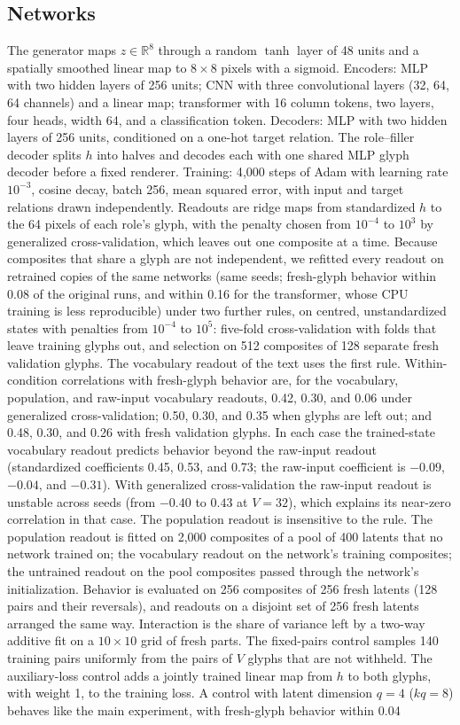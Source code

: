 \documentclass[10pt]{article}
\theoremstyle{plain}
\theoremstyle{remark}
\newcommand{\R}{\mathbb{R}}
\begin{document}
\subsection{Networks}
The generator maps $z \in \R^8$ through a random $\tanh$ layer of 48 units and a spatially smoothed linear map to $8 \times 8$ pixels with a sigmoid. Encoders: MLP with two hidden layers of 256 units; CNN with three convolutional layers (32, 64, 64 channels) and a linear map; transformer with 16 column tokens, two layers, four heads, width 64, and a classification token. Decoders: MLP with two hidden layers of 256 units, conditioned on a one-hot target relation. The role--filler decoder splits $h$ into halves and decodes each with one shared MLP glyph decoder before a fixed renderer. Training: 4{,}000 steps of Adam with learning rate $10^{-3}$, cosine decay, batch 256, mean squared error, with input and target relations drawn independently. Readouts are ridge maps from standardized $h$ to the 64 pixels of each role's glyph, with the penalty chosen from $10^{-4}$ to $10^{3}$ by generalized cross-validation, which leaves out one composite at a time. Because composites that share a glyph are not independent, we refitted every readout on retrained copies of the same networks (same seeds; fresh-glyph behavior within 0.08 of the original runs, and within 0.16 for the transformer, whose CPU training is less reproducible) under two further rules, on centred, unstandardized states with penalties from $10^{-4}$ to $10^{5}$: five-fold cross-validation with folds that leave training glyphs out, and selection on 512 composites of 128 separate fresh validation glyphs. The vocabulary readout of the text uses the first rule. Within-condition correlations with fresh-glyph behavior are, for the vocabulary, population, and raw-input vocabulary readouts, 0.42, 0.30, and 0.06 under generalized cross-validation; 0.50, 0.30, and 0.35 when glyphs are left out; and 0.48, 0.30, and 0.26 with fresh validation glyphs. In each case the trained-state vocabulary readout predicts behavior beyond the raw-input readout (standardized coefficients 0.45, 0.53, and 0.73; the raw-input coefficient is $-0.09$, $-0.04$, and $-0.31$). With generalized cross-validation the raw-input readout is unstable across seeds (from $-0.40$ to $0.43$ at $V = 32$), which explains its near-zero correlation in that case. The population readout is insensitive to the rule. The population readout is fitted on 2{,}000 composites of a pool of 400 latents that no network trained on; the vocabulary readout on the network's training composites; the untrained readout on the pool composites passed through the network's initialization. Behavior is evaluated on 256 composites of 256 fresh latents (128 pairs and their reversals), and readouts on a disjoint set of 256 fresh latents arranged the same way. Interaction is the share of variance left by a two-way additive fit on a $10 \times 10$ grid of fresh parts. The fixed-pairs control samples 140 training pairs uniformly from the pairs of $V$ glyphs that are not withheld. The auxiliary-loss control adds a jointly trained linear map from $h$ to both glyphs, with weight 1, to the training loss. A control with latent dimension $q = 4$ ($kq = 8$) behaves like the main experiment, with fresh-glyph behavior within 0.04 
\end{document}

